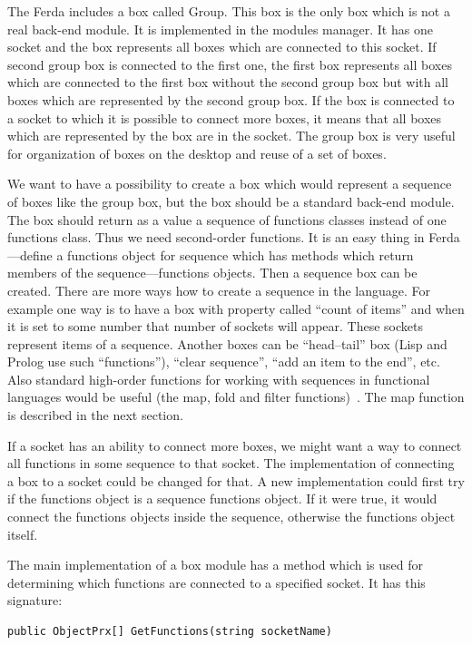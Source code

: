 \documentclass[a4paper,12pt]{book}
\begin{document}
The Ferda includes a box called Group. This box is the only box which is not a real back-end module. It is implemented in the modules manager. It has one socket and the box represents all boxes which are connected to this socket. If second group box is connected to the first one, the first box represents all boxes which are connected to the first box without the second group box but with all boxes which are represented by the second group box. If the box is connected to a socket to which it is possible to connect more boxes, it means that all boxes which are represented by the box are in the socket. The group box is very useful for organization of boxes on the desktop and reuse of a set of boxes.

We want to have a possibility to create a box which would represent a sequence of boxes like the group box, but the box should be a standard back-end module. The box should return as a value a sequence of functions classes instead of one functions class. Thus we need second-order functions. It is an easy thing in Ferda---define a functions object for sequence which has methods which return members of the sequence---functions objects. Then a sequence box can be created. There are more ways how to create a sequence in the language. For example one way is to have a box with property called ``count of items'' and when it is set to some number that number of sockets will appear. These sockets represent items of a sequence. Another boxes can be ``head--tail'' box (Lisp and Prolog use such ``functions''), ``clear sequence'',  ``add an item to the end'', etc. Also standard high-order functions for working with sequences in functional languages would be useful (the map, fold and filter functions)~\cite{webHighOrderFunctions}. The map function is described in the next section.

If a socket has an ability to connect more boxes, we might want a way to connect all functions in some sequence to that socket. The implementation of connecting a box to a socket could be changed for that. A new implementation could first try if the functions object is a sequence functions object. If it were true, it would connect the functions objects inside the sequence, otherwise the functions object itself.

The main implementation of a box module has a method which is used for determining which functions are connected to a specified socket. It has this signature:
\begin{verbatim}
public ObjectPrx[] GetFunctions(string socketName)
\end{verbatim}
\end{document}
